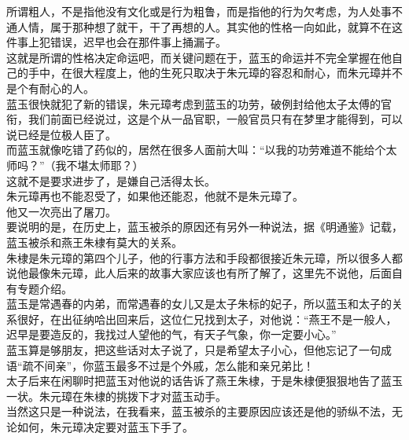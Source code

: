 \begin{multicols}{\theparacolNo}
所谓粗人，不是指他没有文化或是行为粗鲁，而是指他的行为欠考虑，为人处事不通人情，属于那种想了就干，干了再想的人。其实他的性格一向如此，就算不在这件事上犯错误，迟早也会在那件事上捅漏子。\\

这就是所谓的性格决定命运吧，而关键问题在于，蓝玉的命运并不完全掌握在他自己的手中，在很大程度上，他的生死只取决于朱元璋的容忍和耐心，而朱元璋并不是个有耐心的人。\\

蓝玉很快就犯了新的错误，朱元璋考虑到蓝玉的功劳，破例封给他太子太傅的官衔，我们前面已经说过，这是个从一品官职，一般官员只有在梦里才能得到，可以说已经是位极人臣了。\\

而蓝玉就像吃错了药似的，居然在很多人面前大叫：“以我的功劳难道不能给个太师吗？”（我不堪太师耶？）\\

这就不是要求进步了，是嫌自己活得太长。\\

朱元璋再也不能忍受了，如果他还能忍，他就不是朱元璋了。\\

他又一次亮出了屠刀。\\

要说明的是，在历史上，蓝玉被杀的原因还有另外一种说法，据《明通鉴》记载，蓝玉被杀和燕王朱棣有莫大的关系。\\

朱棣是朱元璋的第四个儿子，他的行事方法和手段都很接近朱元璋，所以很多人都说他最像朱元璋，此人后来的故事大家应该也有所了解了，这里先不说他，后面自有专题介绍。\\

蓝玉是常遇春的内弟，而常遇春的女儿又是太子朱标的妃子，所以蓝玉和太子的关系很好，在出征纳哈出回来后，这位仁兄找到太子，对他说：“燕王不是一般人，迟早是要造反的，我找过人望他的气，有天子气象，你一定要小心。”\\

蓝玉算是够朋友，把这些话对太子说了，只是希望太子小心，但他忘记了一句成语“疏不间亲”，你蓝玉最多不过是个外戚，怎么能和亲兄弟比！\\

太子后来在闲聊时把蓝玉对他说的话告诉了燕王朱棣，于是朱棣便狠狠地告了蓝玉一状。朱元璋在朱棣的挑拨下才对蓝玉动手。\\

当然这只是一种说法，在我看来，蓝玉被杀的主要原因应该还是他的骄纵不法，无论如何，朱元璋决定要对蓝玉下手了。\\


\end{multicols}
